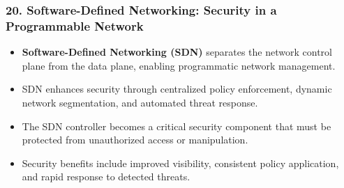 \documentclass{beamer}
\begin{document}
	\begin{frame}
		\frametitle{20. Software-Defined Networking: Security in a Programmable Network}
		\begin{itemize}
			\item \textbf{Software-Defined Networking (SDN)} separates the network control plane from the data plane, enabling programmatic network management.
			\item SDN enhances security through centralized policy enforcement, dynamic network segmentation, and automated threat response.
			\item The SDN controller becomes a critical security component that must be protected from unauthorized access or manipulation.
			\item Security benefits include improved visibility, consistent policy application, and rapid response to detected threats.
		\end{itemize}
		
	\end{frame}
	
\end{document}
